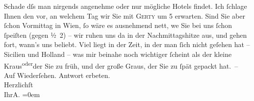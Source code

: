\begin{ledgroupsized}[t]{13cm}
               Schade dſs man nirgends angenehme oder nur mögliche Hotels findet. Ich ſchlage Ihnen
               den \label{K_L01407_1v}\label{K_L01407_1h} vor, an
               welchem Tag wir Sie mit \textsc{Gerty} um 5 erwarten. Sind Sie aber {\pb}ſchon
                  Vormittag in Wien, ſo wäre es
               ausnehmend nett, we{\geminationn}{ }Sie bei uns ſchon ſpeiſten (gegen ½ 2)
               – wir ruhen uns da{\geminationn} in der Nachmittagshitze aus, und
               gehen fort, wann’s uns beliebt. Viel liegt in der Zeit, in der man ſich nicht geſehen
               hat – Sicilien und Holland – was mir beinahe noch wichtiger ſcheint als der kleine Kraus\substVorne{}\textsuperscript{oder}\substDazwischen{}der Sie zu früh, und\substHinten{} der große Graus, der Sie zu ſpät gepackt hat. –\pend
           \pstart
           Auf Wiederſehen. Antwort erbeten.{\\[\baselineskip]}Herzlichſt{\\[\baselineskip]}Ihr\spacefill\mbox{A.}\pend
           \leftskip=0em{}
         
         \endnumbering{}\end{ledgroupsized}  \newcommand{\dateiname}{L01407}\newcommand{\titel}{Arthur Schnitzler an Hugo von Hofmannsthal, [19.? 6. 1904]}\newcommand{\editorInnen}{Martin Anton Müller und Gerd-Hermann Susen}
      